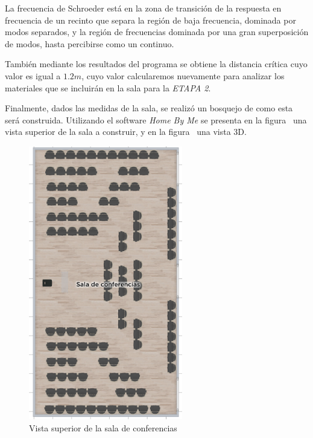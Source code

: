 \par La frecuencia de Schroeder está en la zona de transición de la respuesta en frecuencia de un recinto que separa la región de baja frecuencia, dominada por modos separados, y la región de frecuencias dominada por una gran superposición de modos, hasta percibirse como un continuo.\\

\par También mediante los resultados del programa se obtiene la distancia crítica cuyo valor es igual a $1.2m$, cuyo valor calcularemos nuevamente para analizar los materiales que se incluirán en la sala para la \textit{ETAPA 2}.\\

\par Finalmente, dados las medidas de la sala, se realizó un bosquejo de como esta será construida. Utilizando el software \textit{Home By Me} se presenta en la figura~ una vista superior de la sala a construir, y en la figura ~una vista 3D.

\begin{figure}[H]
	\centering
	\includegraphics[width=0.6\textwidth]{./img/sala.png}
	\caption{Vista superior de la sala de conferencias}
	\label{fig:vista_sup_sala}
\end{figure}


